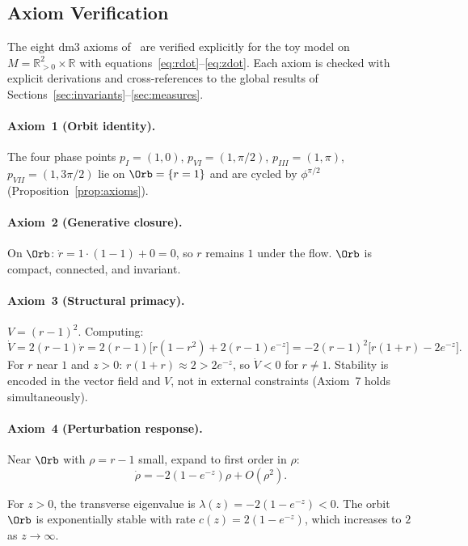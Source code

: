 \subsection{Axiom Verification}\label{subsec:axioms}

The eight dm3 axioms of~\cite{Paper1} are verified explicitly for
the toy model on $M=\mathbb{R}^2_{>0}\times\mathbb{R}$ with
equations~\eqref{eq:rdot}--\eqref{eq:zdot}. Each axiom is checked
with explicit derivations and cross-references to the global results
of Sections~\ref{sec:invariants}--\ref{sec:measures}.

\paragraph{Axiom~1 (Orbit identity).}
The four phase points $p_I=(1,0)$, $p_{VI}=(1,\pi/2)$,
$p_{III}=(1,\pi)$, $p_{VII}=(1,3\pi/2)$ lie on $\Orb=\{r=1\}$
and are cycled by $\phi^{\pi/2}$ (Proposition~\ref{prop:axioms}).

\paragraph{Axiom~2 (Generative closure).}
On $\Orb$: $\dot r = 1\cdot(1-1) + 0 = 0$, so $r$ remains $1$
under the flow. $\Orb$ is compact, connected, and invariant.

\paragraph{Axiom~3 (Structural primacy).}
$V=(r-1)^2$. Computing:
\[
  \dot V = 2(r-1)\dot r
  = 2(r-1)\bigl[r(1-r^2) + 2(r-1)e^{-z}\bigr]
  = -2(r-1)^2\bigl[r(1+r) - 2e^{-z}\bigr].
\]
For $r$ near $1$ and $z>0$: $r(1+r)\approx 2 > 2e^{-z}$, so
$\dot V < 0$ for $r\ne 1$. Stability is encoded in the vector
field and $V$, not in external constraints (Axiom~7 holds
simultaneously).

\paragraph{Axiom~4 (Perturbation response).}
Near $\Orb$ with $\rho=r-1$ small, expand to first order in $\rho$:
\[
  \dot\rho = -2(1-e^{-z})\rho + O(\rho^2).
\]

\begin{lemma}\label{lem:transverse}
For $z>0$, the transverse eigenvalue is
$\lambda(z) = -2(1-e^{-z}) < 0$.
The orbit $\Orb$ is exponentially stable with rate
$c(z) = 2(1-e^{-z})$, which increases to $2$ as $z\to\infty$.
\end{lemma}

